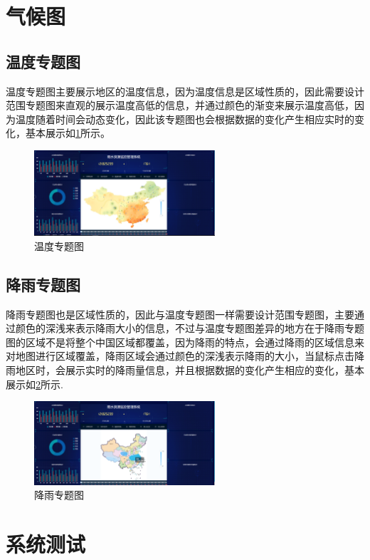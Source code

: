 \section{气候图}
\subsection{温度专题图}
温度专题图主要展示地区的温度信息，因为温度信息是区域性质的，因此需要设计范围专题图来直观的展示温度高低的信息，并通过颜色的渐变来展示温度高低，因为温度随着时间会动态变化，因此该专题图也会根据数据的变化产生相应实时的变化，基本展示如\ref{fig:wendu}所示。
\begin{figure}[!htb]%
	\centering
	\includegraphics[width=0.60\textwidth]{figs/温度图.png}
	\caption{温度专题图}
	\label{fig:wendu}
\end{figure}
\subsection{降雨专题图}
降雨专题图也是区域性质的，因此与温度专题图一样需要设计范围专题图，主要通过颜色的深浅来表示降雨大小的信息，不过与温度专题图差异的地方在于降雨专题图的区域不是将整个中国区域都覆盖，因为降雨的特点，会通过降雨的区域信息来对地图进行区域覆盖，降雨区域会通过颜色的深浅表示降雨的大小，当鼠标点击降雨地区时，会展示实时的降雨量信息，并且根据数据的变化产生相应的变化，基本展示如\ref{fig:jiangyu}所示.
\begin{figure}[!htb]%
	\centering
	\includegraphics[width=0.60\textwidth]{figs/降雨.png}
	\caption{降雨专题图}
	\label{fig:jiangyu}
\end{figure}
\section{系统测试}
